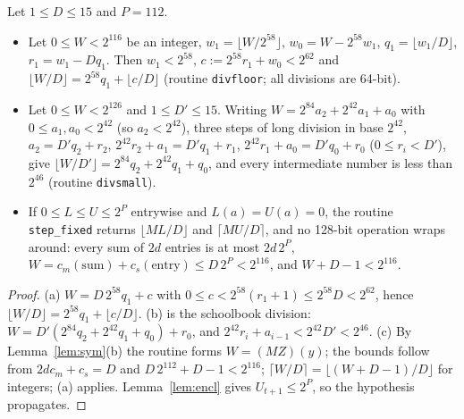 \begin{lemma}\label{lem:cint}
Let $1\le D\le15$ and $P=112$.
\begin{itemize}
\item[(a)] Let $0\le W<2^{116}$ be an integer, $w_1=\lfloor W/2^{58}\rfloor$, $w_0=W-2^{58}w_1$, $q_1=\lfloor w_1/D\rfloor$, $r_1=w_1-Dq_1$. Then $w_1<2^{58}$, $c:=2^{58}r_1+w_0<2^{62}$ and $\lfloor W/D\rfloor=2^{58}q_1+\lfloor c/D\rfloor$ (routine \texttt{divfloor}; all divisions are 64-bit).
\item[(b)] Let $0\le W<2^{126}$ and $1\le D'\le15$. Writing $W=2^{84}a_2+2^{42}a_1+a_0$ with $0\le a_1,a_0<2^{42}$ (so $a_2<2^{42}$), three steps of long division in base $2^{42}$, $a_2=D'q_2+r_2$, $2^{42}r_2+a_1=D'q_1+r_1$, $2^{42}r_1+a_0=D'q_0+r_0$ ($0\le r_i<D'$), give $\lfloor W/D'\rfloor=2^{84}q_2+2^{42}q_1+q_0$, and every intermediate number is less than $2^{46}$ (routine \texttt{divsmall}).
\item[(c)] If $0\le L\le U\le2^P$ entrywise and $L(a)=U(a)=0$, the routine \texttt{step\_fixed} returns $\lfloor ML/D\rfloor$ and $\lceil MU/D\rceil$, and no 128-bit operation wraps around: every sum of $2d$ entries is at most $2d\,2^P$, $W=c_m(\text{sum})+c_s(\text{entry})\le D\,2^P<2^{116}$, and $W+D-1<2^{116}$.
\end{itemize}
\end{lemma}
\begin{proof}
(a) $W=D\,2^{58}q_1+c$ with $0\le c<2^{58}(r_1+1)\le2^{58}D<2^{62}$, hence $\lfloor W/D\rfloor=2^{58}q_1+\lfloor c/D\rfloor$. (b) is the schoolbook division: $W=D'(2^{84}q_2+2^{42}q_1+q_0)+r_0$, and $2^{42}r_i+a_{i-1}<2^{42}D'<2^{46}$. (c) By Lemma~\ref{lem:sym}(b) the routine forms $W=(MZ)(y)$; the bounds follow from $2dc_m+c_s=D$ and $D\,2^{112}+D-1<2^{116}$; $\lceil W/D\rceil=\lfloor(W+D-1)/D\rfloor$ for integers; (a) applies. Lemma~\ref{lem:encl} gives $U_{t+1}\le2^P$, so the hypothesis propagates.
\end{proof}

